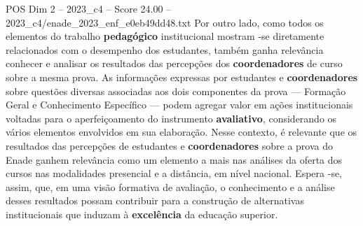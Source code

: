 \begin{textsample}{POS Dim 2 – 2023\_c4 – Score 24.00 – 2023\_c4/enade\_2023\_enf\_e0eb49dd48.txt}
Por outro lado, como todos os elementos do trabalho \textbf{pedagógico} institucional mostram -se diretamente relacionados com o desempenho dos estudantes, também ganha relevância conhecer e analisar os resultados das percepções dos \textbf{coordenadores} de curso sobre a mesma prova.
As informações expressas por estudantes e \textbf{coordenadores} sobre questões diversas associadas aos dois componentes da prova — Formação Geral e Conhecimento Específico — podem agregar valor em ações institucionais voltadas para o aperfeiçoamento do instrumento \textbf{avaliativo}, considerando os vários elementos envolvidos em sua elaboração.
Nesse contexto, é relevante que os resultados das percepções de estudantes e \textbf{coordenadores} sobre a prova do Enade ganhem relevância como um elemento a mais nas análises da oferta dos cursos nas modalidades presencial e a distância, em nível nacional.
Espera -se, assim, que, em uma visão formativa de avaliação, o conhecimento e a análise desses resultados possam contribuir para a construção de alternativas institucionais que induzam à \textbf{excelência} da educação superior.

\end{textsample}
